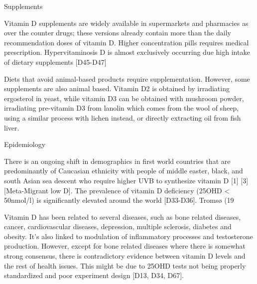  

Supplements 

 

Vitamin D supplements are widely available in supermarkets and pharmacies as over the counter drugs; these versions already contain more than the daily recommendation doses of vitamin D. Higher concentration pills requires medical prescription. Hypervitaminosis D is almost exclusively occurring due high intake of dietary supplements [D45-D47] 

 

Diets that avoid animal-based products require supplementation. However, some supplements are also animal based. Vitamin D2 is obtained by irradiating ergosterol in yeast, while vitamin D3 can be obtained with mushroom powder, irradiating pre-vitamin D3 from lanolin which comes from the wool of sheep, using a similar process with lichen instead, or directly extracting oil from fish liver. 

 

Epidemiology 

 

There is an ongoing shift in demographics in first world countries that are predominantly of Caucasian ethnicity with people of middle easter, black, and south Asian sea descent who require higher UVB to synthesize vitamin D [1] [3] [Meta-Migrant low D].  The prevalence of vitamin D deficiency (25OHD < 50nmol/l) is significantly elevated around the world [D33-D36]. Tromsø (19%

 

Vitamin D has been related to several diseases, such as bone related diseases, cancer, cardiovascular diseases, depression, multiple sclerosis, diabetes and obesity. It's also linked to modulation of inflammatory processes and testosterone production. However, except for bone related diseases where there is somewhat strong consensus, there is contradictory evidence between vitamin D levels and the rest of health issues. This might be due to 25OHD tests not being properly standardized and poor experiment design [D13, D34, D67]. 

